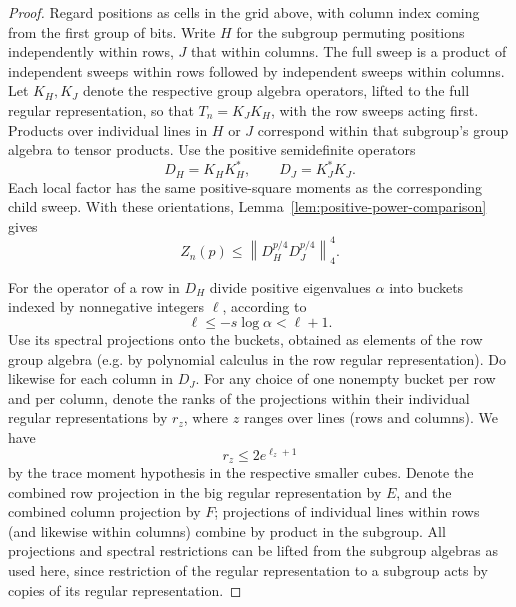\begin{proof}\label{tra:inverse-color:recursion-proof}
\label{tra:inverse-color:projection-overlap-and-bucket-summation}
Regard positions as cells in the grid above, with column index coming from the first group of bits. Write \(H\) for the subgroup permuting positions independently within rows, \(J\) that within columns. The full sweep is a product of independent sweeps within rows followed by independent sweeps within columns. Let \(K_H,K_J\) denote the respective group algebra operators, lifted to the full regular representation, so that $T_n=K_JK_H$, with the row sweeps acting first. Products over individual lines in \(H\) or \(J\) correspond within that subgroup's group algebra to tensor products. Use the positive semidefinite operators
\[
                      D_H=K_H K_H^*,\qquad D_J=K_J^* K_J .
\]
Each local factor has the same positive-square moments as the
corresponding child sweep. With these orientations,
Lemma~\ref{lem:positive-power-comparison} gives
\begin{equation}
 Z_n(p)\le\left\|D_H^{p/4}D_J^{p/4}\right\|_4^4.
 \label{tra:inverse-color:eq6}
\end{equation}

For the operator of a row in \(D_H\) divide positive eigenvalues \(\alpha\) into buckets indexed by nonnegative integers \(\ell\), according to
\[
                            \ell\le -s\log\alpha <\ell+1 .
\]
Use its spectral projections onto the buckets, obtained as elements of the row group algebra (e.g. by polynomial calculus in the row regular representation). Do likewise for each column in \(D_J\). For any choice of one nonempty bucket per row and per column, denote the ranks of the projections within their individual regular representations by \(r_z\), where \(z\) ranges over lines (rows and columns). We have
\begin{equation}
                                   r_z\le 2 e^{\ell_z+1}                        \label{tra:inverse-color:eq7}
\end{equation}
by the trace moment hypothesis in the respective smaller cubes. Denote the combined row projection in the big regular representation by \(E\), and the combined column projection by \(F\); projections of individual lines within rows (and likewise within columns) combine by product in the subgroup. All projections and spectral restrictions can be lifted from the subgroup algebras as used here, since restriction of the regular representation to a subgroup acts by copies of its regular representation.


\end{proof}
